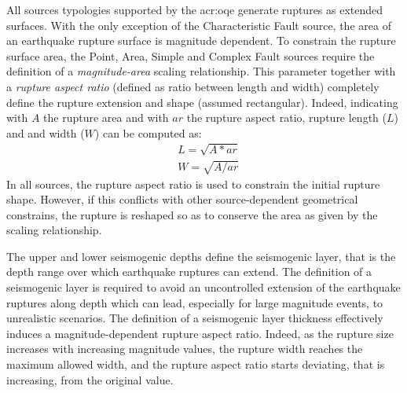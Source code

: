 All sources typologies supported by the \gls{acr:oqe} generate ruptures as
extended surfaces. With the only exception of the Characteristic Fault source,
the area of an earthquake rupture surface is magnitude dependent. To constrain
the rupture surface area, the Point, Area, Simple and Complex Fault sources
require the definition of a \textit{magnitude-area} scaling relationship.
This parameter together with a \textit{rupture aspect ratio} (defined as ratio
between length and width) completely define the rupture extension and shape
(assumed rectangular). Indeed, indicating with $A$ the rupture area and with
$ar$ the rupture aspect ratio, rupture length ($L$) and and width ($W$) can be
computed as:
\begin{equation}
\begin{split} \label{eq:rup_l_w}
&L = \sqrt{A * ar}  \\
&W = \sqrt{A / ar}
\end{split}
\end{equation}
In all sources, the rupture aspect ratio is used to constrain the initial
rupture shape. However, if this conflicts with other source-dependent
geometrical constrains, the rupture is reshaped so as to conserve the area as
given by the scaling relationship.

The upper and lower seismogenic depths define the seismogenic layer, that is the
depth range over which earthquake ruptures can extend. The definition of a
seismogenic layer is required to avoid an uncontrolled extension of the
earthquake ruptures along depth which can lead, especially for large magnitude
events, to unrealistic scenarios. The definition of a seismogenic layer
thickness effectively induces a magnitude-dependent rupture aspect ratio.
Indeed, as the rupture size increases with increasing magnitude values, the
rupture width reaches the maximum allowed width, and the rupture aspect ratio
starts deviating, that is increasing, from the original value.

